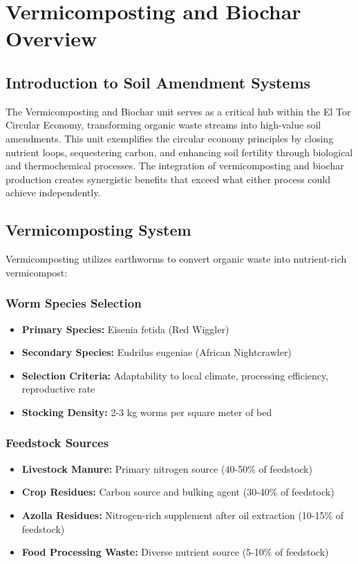 \section{Vermicomposting and Biochar Overview}

\subsection{Introduction to Soil Amendment Systems}

The Vermicomposting and Biochar unit serves as a critical hub within the El Tor Circular Economy, transforming organic waste streams into high-value soil amendments. This unit exemplifies the circular economy principles by closing nutrient loops, sequestering carbon, and enhancing soil fertility through biological and thermochemical processes. The integration of vermicomposting and biochar production creates synergistic benefits that exceed what either process could achieve independently.

\subsection{Vermicomposting System}

Vermicomposting utilizes earthworms to convert organic waste into nutrient-rich vermicompost:

\subsubsection{Worm Species Selection}
\begin{itemize}
    \item \textbf{Primary Species:} Eisenia fetida (Red Wiggler)
    \item \textbf{Secondary Species:} Eudrilus eugeniae (African Nightcrawler)
    \item \textbf{Selection Criteria:} Adaptability to local climate, processing efficiency, reproductive rate
    \item \textbf{Stocking Density:} 2-3 kg worms per square meter of bed
\end{itemize}

\subsubsection{Feedstock Sources}
\begin{itemize}
    \item \textbf{Livestock Manure:} Primary nitrogen source (40-50\% of feedstock)
    \item \textbf{Crop Residues:} Carbon source and bulking agent (30-40\% of feedstock)
    \item \textbf{Azolla Residues:} Nitrogen-rich supplement after oil extraction (10-15\% of feedstock)
    \item \textbf{Food Processing Waste:} Diverse nutrient source (5-10\% of feedstock)
\end{itemize}

